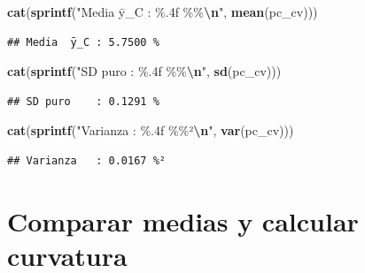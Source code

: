 \documentclass[
]{article}
\newenvironment{Shaded}{\begin{snugshade}}{\end{snugshade}}
\newcommand{\FunctionTok}[1]{\textcolor[rgb]{0.13,0.29,0.53}{\textbf{#1}}}
\newcommand{\NormalTok}[1]{#1}
\newcommand{\SpecialCharTok}[1]{\textcolor[rgb]{0.81,0.36,0.00}{\textbf{#1}}}
\newcommand{\StringTok}[1]{\textcolor[rgb]{0.31,0.60,0.02}{#1}}
\begin{document}
\begin{Shaded}
\begin{Highlighting}[]
\FunctionTok{cat}\NormalTok{(}\FunctionTok{sprintf}\NormalTok{(}\StringTok{"Media  ȳ\_C : \%.4f \%\%}\SpecialCharTok{\textbackslash{}n}\StringTok{"}\NormalTok{,  }\FunctionTok{mean}\NormalTok{(pc\_cv)))}
\end{Highlighting}
\end{Shaded}

\begin{verbatim}
## Media  ȳ_C : 5.7500 %
\end{verbatim}

\begin{Shaded}
\begin{Highlighting}[]
\FunctionTok{cat}\NormalTok{(}\FunctionTok{sprintf}\NormalTok{(}\StringTok{"SD puro    : \%.4f \%\%}\SpecialCharTok{\textbackslash{}n}\StringTok{"}\NormalTok{,  }\FunctionTok{sd}\NormalTok{(pc\_cv)))}
\end{Highlighting}
\end{Shaded}

\begin{verbatim}
## SD puro    : 0.1291 %
\end{verbatim}

\begin{Shaded}
\begin{Highlighting}[]
\FunctionTok{cat}\NormalTok{(}\FunctionTok{sprintf}\NormalTok{(}\StringTok{"Varianza   : \%.4f \%\%²}\SpecialCharTok{\textbackslash{}n}\StringTok{"}\NormalTok{, }\FunctionTok{var}\NormalTok{(pc\_cv)))}
\end{Highlighting}
\end{Shaded}

\begin{verbatim}
## Varianza   : 0.0167 %²
\end{verbatim}

\section{Comparar medias y calcular
curvatura}\label{comparar-medias-y-calcular-curvatura}
\end{document}
